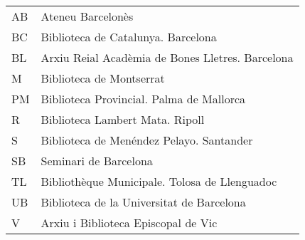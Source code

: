 \begin{center}
\begin{tabular}{l l}
  AB & \hspace{2em} Ateneu Barcelonès \\
  BC & \hspace{2em} Biblioteca de Catalunya. Barcelona \\
  BL & \hspace{2em} Arxiu Reial Acadèmia de Bones Lletres. Barcelona \\
  M & \hspace{2em} Biblioteca de Montserrat \\
  PM & \hspace{2em} Biblioteca Provincial. Palma de Mallorca \\
  R & \hspace{2em} Biblioteca Lambert Mata. Ripoll \\
  S & \hspace{2em} Biblioteca de Menéndez Pelayo. Santander \\
  SB & \hspace{2em} Seminari de Barcelona \\
  TL & \hspace{2em} Bibliothèque Municipale. Tolosa de Llenguadoc \\
  UB & \hspace{2em} Biblioteca de la Universitat de Barcelona \\
  V & \hspace{2em} Arxiu i Biblioteca Episcopal de Vic \\
\end{tabular}
\end{center}